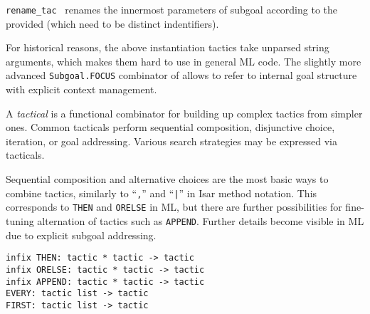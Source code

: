 \begin{isabellebody}
\begin{isamarkuptext}
\begin{description}
  \item \verb|rename_tac|~ renames the innermost
  parameters of subgoal  according to the provided  (which need to be distinct indentifiers).

  \end{description}

  For historical reasons, the above instantiation tactics take
  unparsed string arguments, which makes them hard to use in general
  ML code.  The slightly more advanced \verb|Subgoal.FOCUS| combinator
  of  allows to refer to internal goal
  structure with explicit context management.%
\end{isamarkuptext}%
\isamarkuptrue%
%
\endisatagmlref
{\isafoldmlref}%
%
\isadelimmlref
%
\endisadelimmlref
%
\isamarkuptrue%
%
\begin{isamarkuptext}%
A \emph{tactical} is a functional combinator for building up
  complex tactics from simpler ones.  Common tacticals perform
  sequential composition, disjunctive choice, iteration, or goal
  addressing.  Various search strategies may be expressed via
  tacticals.%
\end{isamarkuptext}%
\isamarkuptrue%
%
\isamarkuptrue%
%
\begin{isamarkuptext}%
Sequential composition and alternative choices are the most
  basic ways to combine tactics, similarly to ``\verb|,|'' and
  ``\verb||\verb,|,\verb||'' in Isar method notation.  This corresponds to
  \verb|THEN| and \verb|ORELSE| in ML, but there are further
  possibilities for fine-tuning alternation of tactics such as \verb|APPEND|.  Further details become visible in ML due to explicit
  subgoal addressing.%
\end{isamarkuptext}%
\isamarkuptrue%
%
\isadelimmlref
%
\endisadelimmlref
%
\isatagmlref
%
\begin{isamarkuptext}%
\begin{mldecls}
  \verb|infix THEN: tactic * tactic -> tactic| \\
  \verb|infix ORELSE: tactic * tactic -> tactic| \\
  \verb|infix APPEND: tactic * tactic -> tactic| \\
  \verb|EVERY: tactic list -> tactic| \\
  \verb|FIRST: tactic list -> tactic| \\[0.5ex]


\end{mldecls}
\end{isamarkuptext}
\end{isabellebody}
